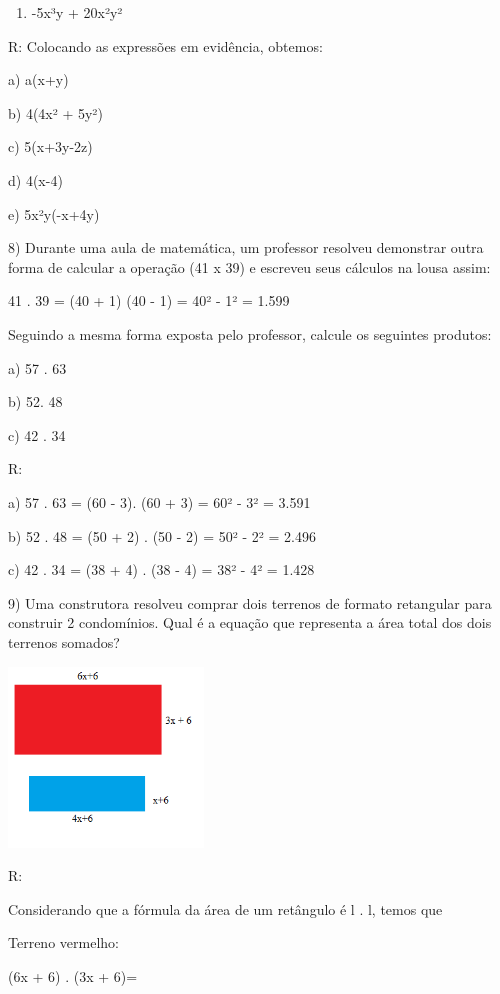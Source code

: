 \begin{enumerate}
\def\labelenumi{\alph{enumi})}
\setcounter{enumi}{4}
\tightlist
\item
  -5x³y + 20x²y²
\end{enumerate}

R: Colocando as expressões em evidência, obtemos:

a) a(x+y)

b) 4(4x² + 5y²)

c) 5(x+3y-2z)

d) 4(x-4)

e) 5x²y(-x+4y)

8) Durante uma aula de matemática, um professor resolveu demonstrar
outra forma de calcular a operação (41 x 39) e escreveu seus cálculos na
lousa assim:

41 . 39 = (40 + 1) (40 - 1) = 40² - 1² = 1.599

Seguindo a mesma forma exposta pelo professor, calcule os seguintes
produtos:

a) 57 . 63

b) 52. 48

c) 42 . 34

R:

a) 57 . 63 = (60 - 3). (60 + 3) = 60² - 3² = 3.591

b) 52 . 48 = (50 + 2) . (50 - 2) = 50² - 2² = 2.496

c) 42 . 34 = (38 + 4) . (38 - 4) = 38² - 4² = 1.428

9) Uma construtora resolveu comprar dois terrenos de formato retangular
para construir 2 condomínios. Qual é a equação que representa a área
total dos dois terrenos somados?

\includegraphics[width=2.04167in,height=1.8873in]{./imgSAEB_8_MAT/media/image5.png}

R:

Considerando que a fórmula da área de um retângulo é l . l, temos que

Terreno vermelho:

(6x + 6) . (3x + 6)=

